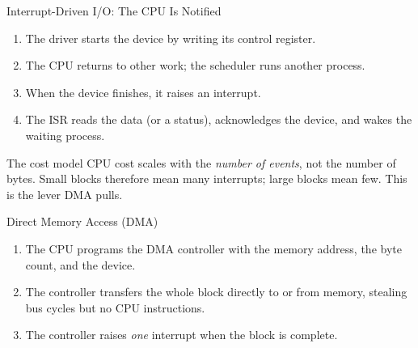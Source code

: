 \documentclass[aspectratio=169]{beamer}
\begin{document}
\begin{frame}{Interrupt-Driven I/O: The CPU Is Notified}
  \begin{enumerate}
    \item The driver starts the device by writing its control register.
    \item The CPU returns to other work; the scheduler runs another process.
    \item When the device finishes, it raises an interrupt.
    \item The ISR reads the data (or a status), acknowledges the device, and
      wakes the waiting process.
  \end{enumerate}
  \vspace{0.2cm}
  \begin{alertblock}{The cost model}
    CPU cost scales with the \emph{number of events}, not the number of bytes.
    Small blocks therefore mean many interrupts; large blocks mean few. This is
    the lever DMA pulls.
  \end{alertblock}
\end{frame}

\begin{frame}{Direct Memory Access (DMA)}
  \centering
  \vspace{0.2cm}
  \begin{enumerate}
    \item The CPU programs the DMA controller with the memory address, the byte
      count, and the device.
    \item The controller transfers the whole block directly to or from memory,
      stealing bus cycles but no CPU instructions.
    \item The controller raises \emph{one} interrupt when the block is complete.
  \end{enumerate}
  \vspace{0.1cm}
\end{frame}
\end{document}

